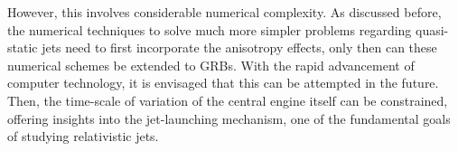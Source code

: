 However, this involves considerable numerical complexity. As discussed before, the numerical techniques to solve much more simpler problems regarding quasi-static jets need to first incorporate the anisotropy effects, only then can these numerical schemes be extended to GRBs. With the rapid advancement of computer technology, it is envisaged that this can be attempted in the future. Then, the time-scale of variation of the central engine itself can be constrained, offering insights into the jet-launching mechanism, one of the fundamental goals of studying relativistic jets.

